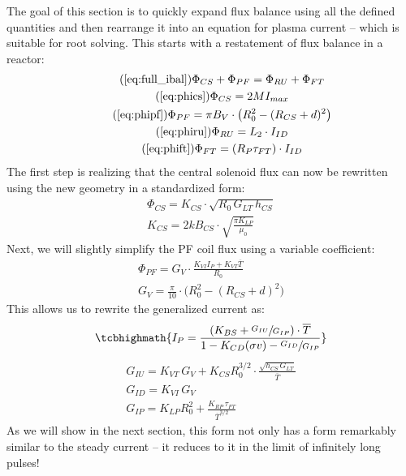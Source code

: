 The goal of this section is to quickly expand flux balance using all the defined quantities and then rearrange it into an equation for plasma current -- which is suitable for root solving. This starts with a restatement of flux balance in a reactor:
\begin{gather}
	\tag{\ref{eq:full_ibal}}
	\Phi_{CS} + \Phi_{PF} = \Phi_{RU} + \Phi_{FT} \\
	\tag{\ref{eq:phics}}
	\Phi_{CS} = 2 M I_{max} \\
	\tag{\ref{eq:phipf}}
	\Phi_{PF} = \pi B_V \cdot \left( R_0^2 - ( R_{CS} + d ) ^ 2 \right) \\
	\tag{\ref{eq:phiru}}
	\Phi_{RU} = L_2 \cdot I_{ID} \\
	\tag{\ref{eq:phift}}
	\Phi_{FT} = ( R_P \tau_{FT} ) \cdot I_{ID}
\end{gather}
The first step is realizing that the central solenoid flux can now be rewritten using the new geometry in a standardized form:
\begin{gather}
	\Phi_{CS} = K_{CS} \cdot \sqrt{ R_0 \, G_{LT} \, h_{CS} } \\
	K_{CS} = 2 k B_{CS} \cdot \sqrt{ \frac{ \pi K_{LP} }{ \mu_0 } }
\end{gather}
Next, we will slightly simplify the PF coil flux using a  variable coefficient:
\begin{gather}
	\Phi_{PF} = G_V \cdot \frac{ K_{VI} I_P + K_{VT} \overline T }{R_0} \\
	G_V = \frac{ \pi }{ 10 } \cdot \big( R_0^2 - \left( R_{CS} + d \right) ^2 \big)
\end{gather}
This allows us to rewrite the generalized current as:
\begin{equation}
	\label{eq:gen_ip}
	\tcbhighmath{
	I_P = \frac{ \left( K_{BS} + \sfrac{ G_{IU} }{ G_{IP} } \right) \cdot \overline T }{ 1 - K_{CD} ( \sigma v ) - \sfrac{ G_{ID} }{ G_{IP} } }
	}
\end{equation}
\begin{gather}
	G_{IU} = K_{VT} \, G_V + K_{CS} R_0^{3/2} \cdot \frac{ \sqrt{ h_{CS} \, G_{LT} } }{ \overline T } \\
	G_{ID} = K_{VI} \, G_V \\
	\label{eq:gip}
	G_{IP} = K_{LP} R_0^2 + \frac{ K_{RP} \, \tau_{FT} }{ \overline T ^ {3/2} }
\end{gather}
As we will show in the next section, this form not only has a form remarkably similar to the steady current -- it reduces to it in the limit of infinitely long pulses!

